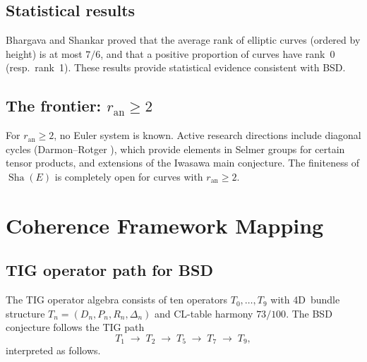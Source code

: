 \documentclass[11pt]{article}
\DeclareMathOperator{\Sha}{Sha}
\begin{document}
\subsection{Statistical results}

Bhargava and Shankar \cite{BS} proved that the average rank of elliptic curves
(ordered by height) is at most $7/6$, and that a positive proportion of curves
have rank~0 (resp.~rank~1).  These results provide statistical evidence
consistent with BSD.

\subsection{The frontier: $r_{\mathrm{an}} \geq 2$}

For $r_{\mathrm{an}} \geq 2$, no Euler system is known.  Active research
directions include diagonal cycles (Darmon--Rotger \cite{DR}), which provide
elements in Selmer groups for certain tensor products, and extensions of the
Iwasawa main conjecture.  The finiteness of $\Sha(E)$ is completely open
for curves with $r_{\mathrm{an}} \geq 2$.

\section{Coherence Framework Mapping}
\label{sec:coherence}

\subsection{TIG operator path for BSD}

The TIG operator algebra consists of ten operators $T_0, \ldots, T_9$ with
4D~bundle structure $T_n = (D_n, P_n, R_n, \Delta_n)$ and CL-table harmony
$73/100$.  The BSD conjecture follows the TIG path
\[
  T_1 \;\longrightarrow\; T_2 \;\longrightarrow\; T_5
  \;\longrightarrow\; T_7 \;\longrightarrow\; T_9,
\]
interpreted as follows.
\end{document}
